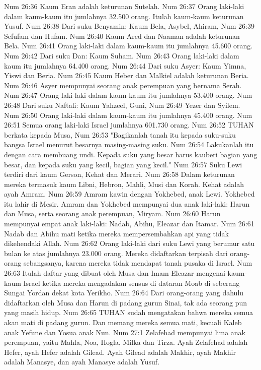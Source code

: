 Num 26:36  Kaum Eran adalah keturunan Sutelah.
Num 26:37  Orang laki-laki dalam kaum-kaum itu jumlahnya 32.500 orang. Itulah kaum-kaum keturunan Yusuf.
Num 26:38  Dari suku Benyamin: Kaum Bela, Asybel, Ahiram,
Num 26:39  Sefufam dan Hufam.
Num 26:40  Kaum Ared dan Naaman adalah keturunan Bela.
Num 26:41  Orang laki-laki dalam kaum-kaum itu jumlahnya 45.600 orang.
Num 26:42  Dari suku Dan: Kaum Suham.
Num 26:43  Orang laki-laki dalam kaum itu jumlahnya 64.400 orang.
Num 26:44  Dari suku Asyer: Kaum Yimna, Yiswi dan Beria.
Num 26:45  Kaum Heber dan Malkiel adalah keturunan Beria.
Num 26:46  Asyer mempunyai seorang anak perempuan yang bernama Serah.
Num 26:47  Orang laki-laki dalam kaum-kaum itu jumlahnya 53.400 orang.
Num 26:48  Dari suku Naftali: Kaum Yahzeel, Guni,
Num 26:49  Yezer dan Syilem.
Num 26:50  Orang laki-laki dalam kaum-kaum itu jumlahnya 45.400 orang.
Num 26:51  Semua orang laki-laki Israel jumlahnya 601.730 orang.
Num 26:52  TUHAN berkata kepada Musa,
Num 26:53  "Bagikanlah tanah itu kepada suku-suku bangsa Israel menurut besarnya masing-masing suku.
Num 26:54  Lakukanlah itu dengan cara membuang undi. Kepada suku yang besar harus kauberi bagian yang besar, dan kepada suku yang kecil, bagian yang kecil."
Num 26:57  Suku Lewi terdiri dari kaum Gerson, Kehat dan Merari.
Num 26:58  Dalam keturunan mereka termasuk kaum Libni, Hebron, Mahli, Musi dan Korah. Kehat adalah ayah Amram.
Num 26:59  Amram kawin dengan Yokhebed, anak Lewi. Yokhebed itu lahir di Mesir. Amram dan Yokhebed mempunyai dua anak laki-laki: Harun dan Musa, serta seorang anak perempuan, Miryam.
Num 26:60  Harun mempunyai empat anak laki-laki: Nadab, Abihu, Eleazar dan Itamar.
Num 26:61  Nadab dan Abihu mati ketika mereka mempersembahkan api yang tidak dikehendaki Allah.
Num 26:62  Orang laki-laki dari suku Lewi yang berumur satu bulan ke atas jumlahnya 23.000 orang. Mereka didaftarkan terpisah dari orang-orang sebangsanya, karena mereka tidak mendapat tanah pusaka di Israel.
Num 26:63  Itulah daftar yang dibuat oleh Musa dan Imam Eleazar mengenai kaum-kaum Israel ketika mereka mengadakan sensus di dataran Moab di seberang Sungai Yordan dekat kota Yerikho.
Num 26:64  Dari orang-orang yang dahulu didaftarkan oleh Musa dan Harun di padang gurun Sinai, tak ada seorang pun yang masih hidup.
Num 26:65  TUHAN sudah mengatakan bahwa mereka semua akan mati di padang gurun. Dan memang mereka semua mati, kecuali Kaleb anak Yefune dan Yosua anak Nun.
Num 27:1  Zelafehad mempunyai lima anak perempuan, yaitu Mahla, Noa, Hogla, Milka dan Tirza. Ayah Zelafehad adalah Hefer, ayah Hefer adalah Gilead. Ayah Gilead adalah Makhir, ayah Makhir adalah Manasye, dan ayah Manasye adalah Yusuf.
